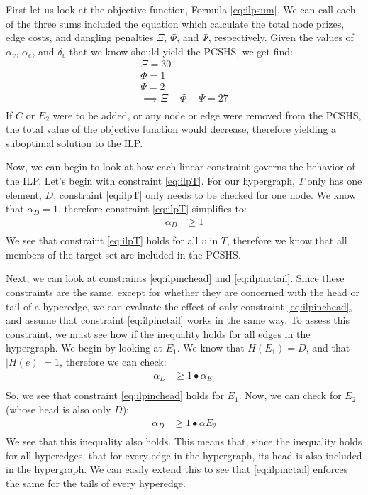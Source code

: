 \documentclass[12pt,twoside]{reedthesis}
\theoremstyle{definition}
\begin{document}
First let us look at the objective function, Formula \eqref{eq:ilpsum}. We can call each of the three sums included the equation which calculate the total node prizes, edge costs, and dangling penalties $\Xi$, $\Phi$, and $\Psi$, respectively. Given the values of $\alpha_v$, $\alpha_e$, and $\delta_v$ that we know should yield the PCSHS, we get find:
\begin{gather*}
 \Xi = 30\\
 \Phi = 1\\
 \Psi = 2\\
 \implies \Xi - \Phi - \Psi = 27\\
\end{gather*}%
If $C$ or $E_2$ were to be added, or any node or edge were removed from the PCSHS, the total value of the objective function would decrease, therefore yielding a suboptimal solution to the ILP.\par

Now, we can begin to look at how each linear constraint governs the behavior of the ILP. Let's begin with constraint \eqref{eq:ilpT}. For our hypergraph, $T$ only has one element, $D$, constraint \eqref{eq:ilpT} only needs to be checked for one node. We know that $\alpha_D = 1$, therefore constraint \eqref{eq:ilpT} simplifies to:
\begin{align*}
  \alpha_D &\geq 1\\
\end{align*}
We see that constraint \eqref{eq:ilpT} holds for all $v$ in $T$, therefore we know that all members of the target set are included in the PCSHS.\par

Next, we can look at constraints \eqref{eq:ilpinchead} and \eqref{eq:ilpinctail}. Since these constraints are the same, except for whether they are concerned with the head or tail of a hyperedge, we can evaluate the effect of only constraint \eqref{eq:ilpinchead}, and assume that constraint \eqref{eq:ilpinctail} works in the same way. To assess this constraint, we must see how if the inequality holds for all edges in the hypergraph. We begin by looking at $E_1$. We know that $H({E_1})=D$, and that $\lvert H(e) \rvert = 1$, therefore we can check:
\begin{align*}
  \alpha_D &\geq 1 \bullet \alpha_{E_1}\\
\end{align*}%
So, we see that constraint \eqref{eq:ilpinchead} holds for $E_1$. Now, we can check for $E_2$ (whose head is also only $D$):
\begin{align*}
  \alpha_D &\geq 1 \bullet \alpha{E_2}\\
\end{align*}%
We see that this inequality also holds. This means that, since the inequality holds for all hyperedges, that for every edge in the hypergraph, its head is also included in the hypergraph. We can easily extend this to see that \eqref{eq:ilpinctail} enforces the same for the tails of every hyperedge.\par
\end{document}
